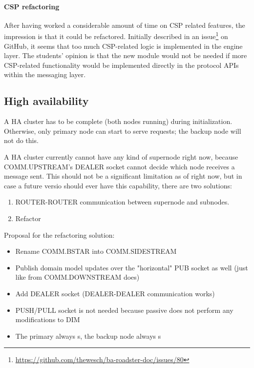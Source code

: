 \paragraph{CSP refactoring}
After having worked a considerable amount of time on \gls{CSP} related
features, the impression is that it could be refactored. Initially described in
an issue\footnote{\url{https://github.com/thewesch/ba-roadster-doc/issues/80}}
on GitHub, it seems that too much CSP-related logic is implemented in the
engine layer. The students' opinion is that the new module
 would not be needed if more CSP-related
functionality would be implemented directly in the protocol APIs within the
messaging layer.

\subsection{High availability}\label{sec:disc:ha}
A HA cluster has to be complete (both nodes running) during initialization.
Otherwise, only primary node can start to serve requests; the backup node will not
do this.


A HA cluster currently cannot have any kind of supernode right now, because
COMM.UPSTREAM's DEALER socket cannot decide which node receives a message sent.
This should not be a significant limitation as of right now, but in case a
future versio should ever have this capability, there are two solutions:

\begin{enumerate}
	\item ROUTER-ROUTER communication between supernode and subnodes.
	\item Refactor
\end{enumerate}

Proposal for the refactoring solution:
\begin{itemize}
\item Rename COMM.BSTAR into COMM.SIDESTREAM
\item Publish domain model updates over the "horizontal" PUB socket as well (just like from COMM.DOWNSTREAM does)
\item Add DEALER socket (DEALER-DEALER communication works)
\item PUSH/PULL socket is not needed because passive does not perform any modifications to DIM
\item The primary always s, the backup node always s
\end{itemize}

